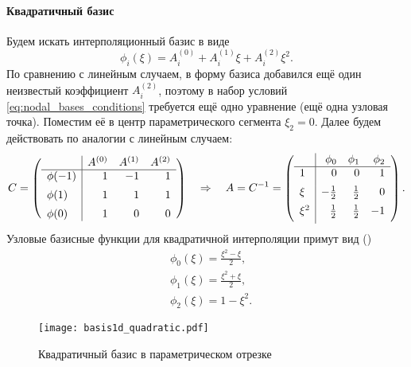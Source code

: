 \paragraph{Квадратичный базис}
Будем искать интерполяционный базис в виде
$$
\phi_i(\xi) = A_i^{(0)} + A_i^{(1)} \xi + A_i^{(2)} \xi^2.
$$
По сравнению с линейным случаем, в форму базиса добавился ещё один неизвестый коэффициент $A_i^{(2)}$,
поэтому в набор условий \cref{eq:nodal_bases_conditions} требуется ещё одно уравнение (ещё одна узловая точка).
Поместим её в центр параметрического сегмента $\xi_2 = 0$. Далее будем действовать по
аналогии с линейным случаем:
$$
C = \left(
\begin{array}{l|rrr}
         &  A^{(0)} & A^{(1)}   & A^{(2)} \\ 
\hline
\phi(-1) & 1 & -1 & 1\\[5pt]
\phi(1)  & 1 &  1 & 1\\[5pt]
\phi(0)  & 1 &  0 & 0
\end{array}
\right)
\quad\Rightarrow\quad
A = C^{-1} = \left(
\begin{array}{l|rrr}
       & \phi_0   & \phi_1   & \phi_2 \\
\hline
 1     & 0        &  0       &  1     \\[5pt]
 \xi   & -\frac12 &  \frac12 &  0     \\[5pt]
 \xi^2 &  \frac12 &  \frac12 & -1     \\[5pt]
\end{array}
\right).
$$
Узловые базисные функции для квадратичной интерполяции примут вид ()
\begin{equation}
\label{eq:segment_quadratic_basis}
\begin{aligned}
&\phi_0(\xi) = \frac{\xi^2 - \xi}{2}, \\
&\phi_1(\xi) = \frac{\xi^2 + \xi}{2}, \\
&\phi_2(\xi) = 1 - \xi^2.
\end{aligned}
\end{equation}

\begin{figure}[h!]
\centering
\texttt{[image: basis1d\_quadratic.pdf]}
\caption{Квадратичный базис в параметрическом отрезке}
\label{fig:basis1d_quadratic}
\end{figure}

